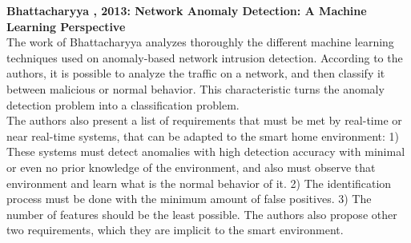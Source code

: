 \textbf{Bhattacharyya \etAl, 2013: Network Anomaly Detection: A Machine Learning Perspective} \cite{Bhattacharyya:2013:NAD:2505468} \\
The work of Bhattacharyya \etAl analyzes thoroughly the different machine learning techniques used on anomaly-based network intrusion detection. According to the authors, it is possible to analyze the traffic on a network, and then classify it between malicious or normal behavior. This characteristic turns the anomaly detection problem into a classification problem\cite{Bhattacharyya:2013:NAD:2505468}.\\
The authors also present a list of requirements that must be met by real-time or near real-time systems, that can be adapted to the smart home environment: 
1) These systems must detect anomalies with high detection accuracy with minimal or even no prior knowledge of the environment, and also must observe that environment and learn what is the normal behavior of it. 
2) The identification process must be done with the minimum amount of false positives. 
3) The number of features should be the least possible. The authors also propose other two requirements, which they are implicit to the smart environment.

